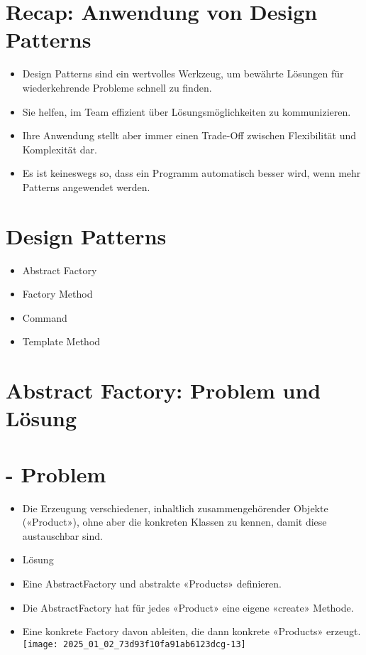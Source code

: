 \section*{Recap: Anwendung von Design Patterns}
\begin{itemize}
  \item Design Patterns sind ein wertvolles Werkzeug, um bewährte Lösungen für wiederkehrende Probleme schnell zu finden.
  \item Sie helfen, im Team effizient über Lösungsmöglichkeiten zu kommunizieren.
  \item Ihre Anwendung stellt aber immer einen Trade-Off zwischen Flexibilität und Komplexität dar.
  \item Es ist keineswegs so, dass ein Programm automatisch besser wird, wenn mehr Patterns angewendet werden.
\end{itemize}

\section*{Design Patterns}
\begin{itemize}
  \item Abstract Factory
  \item Factory Method
  \item Command
  \item Template Method
\end{itemize}

\section*{Abstract Factory: Problem und Lösung}
\section*{- Problem}
\begin{itemize}
  \item Die Erzeugung verschiedener, inhaltlich zusammengehörender Objekte («Product»), ohne aber die konkreten Klassen zu kennen, damit diese austauschbar sind.
  \item Lösung
  \item Eine AbstractFactory und abstrakte «Products» definieren.
  \item Die AbstractFactory hat für jedes «Product» eine eigene «create» Methode.
  \item Eine konkrete Factory davon ableiten, die dann konkrete «Products» erzeugt.\\
\texttt{[image: 2025\_01\_02\_73d93f10fa91ab6123dcg-13]}
\end{itemize}

